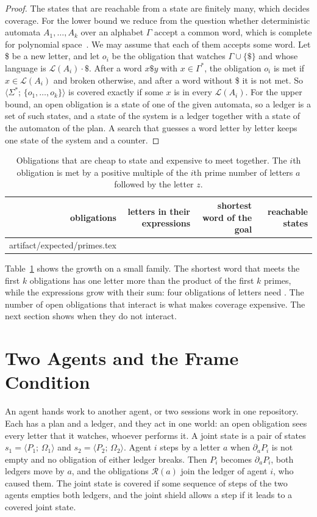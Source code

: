 \documentclass[acmsmall,nonacm,screen]{acmart}
\makeatletter
\newcommand{\st}[2]{\langle #1;\, #2 \rangle}
\newcommand{\lang}[1]{\mathcal{L}(#1)}
\newcommand{\rules}{\mathcal{R}}
\newcommand{\dv}[2]{\partial_{#1}#2}
\newcommand{\claim}[2]{#2}
\newcommand{\rows}[1]{\@@input artifact/expected/#1.tex }
\makeatother
\begin{document}
\begin{proof}
The states that are reachable from a state are finitely many, which decides coverage. For
the lower bound we reduce from the question whether deterministic automata $A_1, \ldots,
A_k$ over an alphabet $\Gamma$ accept a common word, which is complete for polynomial
space~\cite{kozen1977}. We may assume that each of them accepts some word. Let \$ be a new
letter, and let $o_i$ be the obligation that watches $\Gamma \cup \{\$\}$ and whose language
is $\lang{A_i} \cdot \$$. After a word $x \$ y$ with $x \in \Gamma^{*}$, the obligation
$o_i$ is met if $x \in \lang{A_i}$ and broken otherwise, and after a word without \$ it is
not met. So $\st{\Sigma^{*}}{\{o_1, \ldots, o_k\}}$ is covered exactly if some $x$ is in
every $\lang{A_i}$. For the upper bound, an open obligation is a state of one of the given
automata, so a ledger is a set of such states, and a state of the system is a ledger
together with a state of the automaton of the plan. A search that guesses a word letter by
letter keeps one state of the system and a counter.
\end{proof}

\begin{table}
\caption{Obligations that are cheap to state and expensive to meet together. The $i$th
obligation is met by a positive multiple of the $i$th prime number of letters $a$ followed by
the letter $z$.}
\label{tab:primes}
\begin{tabular}{rrrr}
\toprule
obligations & letters in their expressions & shortest word of the goal & reachable states \\
\midrule
\rows{primes}
\bottomrule
\end{tabular}
\end{table}

Table~\ref{tab:primes} shows the growth on a small family. \claim{primes-product}{The
shortest word that meets the first $k$ obligations has one letter more than the product of
the first $k$ primes}, while the expressions grow with their sum: four obligations of
\exPrimesLetters{} letters need \exPrimesLength{}. The number of open obligations that
interact is what makes coverage expensive. The next section shows when they do not interact.

\section{Two Agents and the Frame Condition}
\label{sec:frame}

An agent hands work to another agent, or two sessions work in one repository. Each has a
plan and a ledger, and they act in one world: an open obligation sees every letter that it
watches, whoever performs it. A joint state is a pair of states $s_1 = \st{P_1}{\Omega_1}$
and $s_2 = \st{P_2}{\Omega_2}$. Agent $i$ steps by a letter $a$ when $\dv{a}{P_i}$ is not
empty and no obligation of either ledger breaks. Then $P_i$ becomes $\dv{a}{P_i}$, both
ledgers move by $a$, and the obligations $\rules(a)$ join the ledger of agent $i$, who
caused them. The joint state is covered if some sequence of steps of the two agents empties
both ledgers, and the joint shield allows a step if it leads to a covered joint state.
\end{document}

